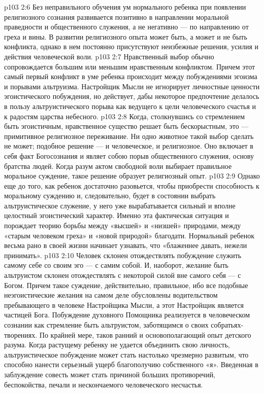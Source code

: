 \vs p103 2:6 Без неправильного обучения ум нормального ребенка при появлении религиозного сознания развивается позитивно в направлении моральной праведности и общественного служения, а не негативно --- по направлению от греха и вины. В развитии религиозного опыта может быть, а может и не быть конфликта, однако в нем постоянно присутствуют неизбежные решения, усилия и действия человеческой воли.
\vs p103 2:7 Нравственный выбор обычно сопровождается большим или меньшим нравственным конфликтом. Причем этот самый первый конфликт в уме ребенка происходит между побуждениями эгоизма и порывами альтруизма. Настройщик Мысли не игнорирует личностные ценности эгоистического побуждения, но действует, дабы некоторое предпочтение делалось в пользу альтруистического порыва как ведущего к цели человеческого счастья и к радостям царства небесного.
\vs p103 2:8 Когда, столкнувшись со стремлением быть эгоистичным, нравственное существо решает быть бескорыстным, это --- примитивное религиозное переживание. Ни одно животное такой выбор сделать не может; подобное решение --- и человеческое, и религиозное. Оно включает в себя факт Богосознания и являет собою порыв общественного служения, основу братства людей. Когда разум актом свободной воли выбирает правильное моральное суждение, такое решение образует религиозный опыт.
\vs p103 2:9 Однако еще до того, как ребенок достаточно разовьется, чтобы приобрести способность к моральному суждению и, следовательно, будет в состоянии выбрать альтруистическое служение, у него уже вырабатывается сильный и вполне целостный эгоистический характер. Именно эта фактическая ситуация и порождает теорию борьбы между «высшей» и «низшей» природами, между «старым человеком греха» и «новой природой» благодати. Нормальный ребенок весьма рано в своей жизни начинает узнавать, что «блаженнее давать, нежели принимать».
\vs p103 2:10 Человек склонен отождествлять побуждение служить самому себе со своим эго --- с самим собой. И, наоборот, желание быть альтруистом склонен отождествлять с некоторой силой вне самого себя --- с Богом. Причем такое суждение, действительно, правильное, ибо все подобные неэгоистические желания на самом деле обусловлены водительством пребывающего в человеке Настройщика Мысли, а этот Настройщик является частицей Бога. Побуждение духовного Помощника реализуется в человеческом сознании как стремление быть альтруистом, заботящимся о своих собратьях\hyp{}творениях. По крайней мере, таков ранний и основополагающий опыт детского разума. Когда растущему ребенку не удается объединить свою личность, альтруистическое побуждение может стать настолько чрезмерно развитым, что способно нанести серьезный ущерб благополучию собственного «я». Введенная в заблуждение совесть может стать причиной больших противоречий, беспокойства, печали и нескончаемого человеческого несчастья.
